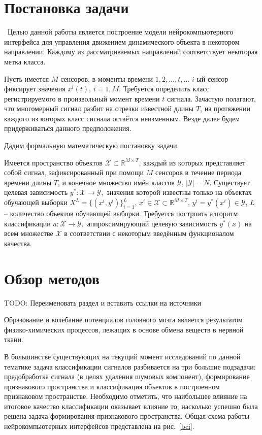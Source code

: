 \documentclass[12pt,fleqn]{article}
\begin{document}
\clearpage 

\section{Постановка задачи}
	\quad\,\,\,Целью данной работы является построение модели нейрокомпьютерного интерфейса для управления движением динамического объекта в некотором направлении. Каждому из рассматриваемых направлений соответствует некоторая метка класса.
 	\par Пусть имеется $M$ сенсоров, в моменты времени $1, 2, \dots, t, \dots$ $i$-ый сенсор фиксирует значения $x^i(t)$, $i = \overline{1,M}.$ Требуется определить класс регистрируемого в произвольный момент времени $t$ сигнала. Зачастую полагают, что многомерный сигнал разбит на отрезки известной длины $T$, на протяжении каждого из которых класс сигнала остаётся неизменным. Везде далее будем придерживаться данного предположения.
	\par Дадим формальную математическую постановку задачи.
	\par Имеется пространство объектов $\mathcal{X} \subset \mathbb{R}^{M \times T}$, каждый из которых представляет собой сигнал, зафиксированный при помощи $M$ сенсоров в течение периода времени длины $T$, и конечное множество имён классов $\mathcal{Y}, \, |\mathcal{Y}| = N$. Существует целевая зависимость $y^*: \mathcal{X} \to \mathcal{Y},$ значения которой известны только на объектах обучающей выборки $X^L = \{ (x^i, y^i)\}_{i=1}^L, \, x^i \in \mathcal{X} \subset \mathbb{R}^{M \times T}, \, y^i = y^*(x^i) \in \mathcal{Y}, \, L$ -- количество объектов обучающей выборки. Требуется построить алгоритм классификации $a: \mathcal{X} \to \mathcal{Y},$ аппроксимирующий целевую зависимость $y^*(x)$ на всем множестве $\mathcal{X}$ в соответствии с некоторым введённым функционалом качества.

\clearpage 

\section{Обзор методов}
	\par TODO: Переименовать раздел и вставить ссылки на источники
	\par Образование и колебание потенциалов головного мозга является результатом физико-химических процессов, лежащих в основе обмена веществ в нервной ткани.
	\par В большинстве существующих на текущий момент исследований по данной тематике задача классификации сигналов разбивается на три большие подзадачи: предобработка сигнала (в целях удаления шумовых компонент), формирование признакового пространства и классификация объектов в построенном признаковом пространстве. Необходимо отметить, что наибольшее влияние на итоговое качество классификации оказывает влияние то, насколько успешно была решена задача формирования признакового пространства. Общая схема работы нейрокомпьютерных интерфейсов представлена на рис.~\ref{bci}.
\end{document}
